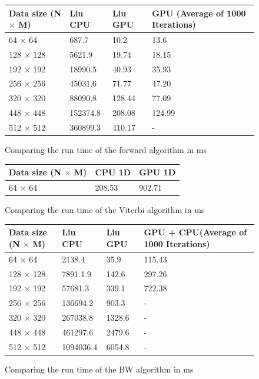 \documentclass[english, paper=a4]{scrartcl}
\begin{document}
\begin{figure}[H]
\centering
\begin{tabular}{|l|l|l|l|}
\hline
Data size (N $\times$ M) & Liu CPU & Liu GPU & GPU (Average of 1000 Iterations)\\ \hline
64 $\times$ 64 & 687.7 & 10.2 & 13.6 \\ \hline
128 $\times$ 128 & 5621.9 & 19.74 & 18.15 \\ \hline
192 $\times$ 192 & 18990.5 & 40.93 & 35.93 \\ \hline
256 $\times$ 256 & 45031.6 & 71.77 & 47.20 \\ \hline
320 $\times$ 320 & 88090.8 & 128.44 & 77.09 \\ \hline
448 $\times$ 448 & 152374.8 & 208.08 & 124.99 \\ \hline
512 $\times$ 512 & 360899.3 & 410.17 & - \\ \hline

\end{tabular}

\caption{Comparing the run time of the forward algorithm in ms}
\end{figure}

\begin{figure}[H]
\centering
\begin{tabular}{|l|l|l|}
\hline
Data size (N $\times$ M) & CPU 1D & GPU 1D \\ \hline
64 $\times$ 64 & 208.53 & 902.71 \\ \hline

\end{tabular}

\caption{Comparing the run time of the Viterbi algorithm in ms}
\end{figure}


\begin{figure}[H]
\centering
\begin{tabular}{|l|l|l|l|}
\hline
Data size (N $\times$ M) & Liu CPU & Liu GPU & GPU + CPU(Average of 1000 Iterations)\\ \hline
64 $\times$ 64 & 2138.4 & 35.9 & 115.43 \\ \hline
128 $\times$ 128 & 7891.1.9 & 142.6 & 297.26 \\ \hline
192 $\times$ 192 & 57681.3 & 339.1 & 722.38 \\ \hline
256 $\times$ 256 & 136694.2 & 903.3 & - \\ \hline
320 $\times$ 320 & 267038.8 & 1328.6 & - \\ \hline
448 $\times$ 448 & 461297.6 & 2479.6 & - \\ \hline
512 $\times$ 512 & 1094036.4 & 6054.8 & - \\ \hline

\end{tabular}

\caption{Comparing the run time of the BW algorithm in ms}
\end{figure}
\end{document}
